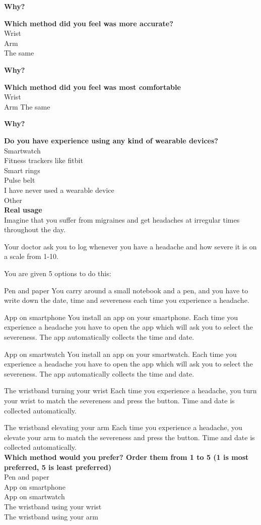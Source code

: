 \textbf{Why?}

\textbf{Which method did you feel was more accurate?}\\
Wrist\\
Arm\\
The same

\textbf{Why?}

\textbf{Which method did you feel was most comfortable}\\
Wrist\\
Arm
The same

\textbf{Why?}

\textbf{Do you have experience using any kind of wearable devices? }\\
Smartwatch\\
Fitness trackers like fitbit\\
Smart rings\\
Pulse belt\\
I have never used a wearable device\\
Other\\

\textbf{Real usage}\\
Imagine that you suffer from migraines and get headaches at irregular times throughout the day.

Your doctor ask you to log whenever you have a headache and how severe it is on a scale from 1-10.

You are given 5 options to do this:

Pen and paper
You carry around a small notebook and a pen, and you have to write down the date, time and severeness each time you experience a headache.

App on smartphone
You install an app on your smartphone. Each time you experience a headache you have to open the app which will ask you to select the severeness. The app automatically collects the time and date.

App on smartwatch
You install an app on your smartwatch. Each time you experience a headache you have to open the app which will ask you to select the severeness. The app automatically collects the time and date.

The wristband turning your wrist
Each time you experience a headache, you turn your wrist to match the severeness and press the button. Time and date is collected automatically.

The wristband elevating your arm
Each time you experience a headache, you elevate your arm to match the severeness and press the button. Time and date is collected automatically.\\
\textbf{Which method would you prefer? Order them from 1 to 5 (1 is most preferred, 5 is least preferred)}\\
Pen and paper\\
App on smartphone\\
App on smartwatch\\
The wristband using your wrist\\
The wristband using your arm






